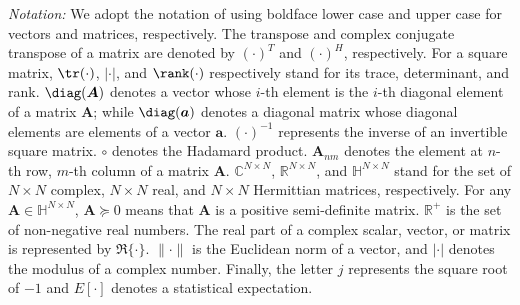 \indent \textit{Notation:}
We adopt the notation of using boldface lower case and upper case for vectors
and matrices, respectively. The transpose and complex conjugate transpose of a matrix
are denoted by $(\cdot)^T$ and $(\cdot)^H$, respectively.
For a square matrix,
$\tr(\cdot)$, $|\cdot|$, and $\rank(\cdot)$ respectively stand for its trace,
determinant, and rank.
$\diag(\boldsymbol{A})$ denotes a vector whose $i$-th element is the
$i$-th diagonal element of a matrix $\boldsymbol{A}$; while
$\diag(\boldsymbol{a})$ denotes
 a diagonal matrix whose diagonal elements are elements of a vector $\boldsymbol{a}$.
  $(\cdot)^{-1}$ represents the inverse of an invertible square matrix.
  $\circ$ denotes the Hadamard product.
  $\boldsymbol{A}_{nm}$ denotes the element at
  $n$-th row, $m$-th column of a matrix $\boldsymbol{A}$.
  $\mathbb{C}^{N \times N}$, $\mathbb{R}^{N \times N}$, and $\mathbb{H}^{N \times N}$
stand for the set of $N \times N$ complex, $N \times N$ real, and $N \times N$
Hermittian matrices, respectively.
For any $\boldsymbol{A} \in \mathbb{H}^{N \times N}$,
$ \boldsymbol{A} \succeq 0$ means that $\boldsymbol{A}$
is a positive semi-definite matrix.
$\mathbb{R}^{+}$ is the set of non-negative real numbers.
The real part of a complex scalar, vector, or matrix is represented by
$\Re \{\cdot \}$.
$\| \cdot \|$ is the Euclidean norm of a vector, and
$|\cdot|$ denotes the modulus of a complex number.
Finally, the letter $j$ represents the square root of $-1$ and $E[\cdot]$ denotes a statistical expectation.

